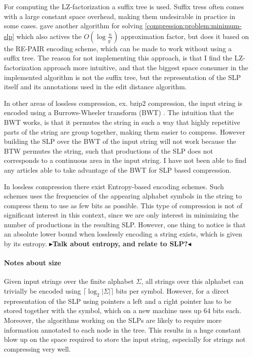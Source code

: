 \documentclass[twoside,11pt,openright]{report}
\newcommand{\todo}[1]{{\color[rgb]{.5,0,0}\textbf{$\blacktriangleright$#1$\blacktriangleleft$}}}
\newcommand{\ceil}[1] {\lceil #1 \rceil}
\begin{document}
For computing the LZ-factorization a suffix tree is used. Suffix tress often comes with a large constant space overhead, making them undesirable in practice in some cases. \cite{Sakamoto2005416} gave another algorithm for solving \cref{compression:problem:minimum-slp} which also actives the $O(\log{\frac{n}{g^*}})$ approximation factor, but does it based on the RE-PAIR encoding scheme, which can be made to work without using a suffix tree. The reason for not implementing this approach, is that I find the LZ-factorization approach more intuitive, and that the biggest space consumer in the implemented algorithm is not the suffix tree, but the representation of the SLP itself and its annotations used in the edit distance algorithm.

In other areas of lossless compression, ex. bzip2 compression, the input string is encoded using a Burrows-Wheeler transform (BWT) \cite{BurrowsWheeler}. The intuition that the BWT works, is that it permutes the string in such a way that highly repetitive parts of the string are group together, making them easier to compress. However building the SLP over the BWT of the input string will not work because the BTW permutes the string, such that productions of the SLP does not corresponds to a continuous area in the input string. I have not been able to find any articles able to take advantage of the BWT for SLP based compression.

In lossless compression there exist Entropy-based encoding schemes. Such schemes uses the frequencies of the appearing alphabet symbols in the string to compress them to use as few bits as possible. This type of compression is not of significant interest in this context, since we are only interest in minimizing the number of productions in the resulting SLP. However, one thing to notice is that an absolute lower bound when losslessly encoding a string exists, which is given by its entropy.
\todo{Talk about entropy, and relate to SLP?}

\paragraph{Notes about size}
Given input strings over the finite alphabet $\Sigma$, all strings over this alphabet can trivially be encoded using $\ceil{\log_2 |\Sigma|}$ bits per symbol. However, for a direct representation of the SLP using pointers a left and a right pointer has to be stored together with the symbol, which on a new machine uses up $64$ bits each. Moreover, the algorithms working on the SLPs are likely to require more information annotated to each node in the tree. This results in a huge constant blow up on the space required to store the input string, especially for strings not compressing very well.
\end{document}
